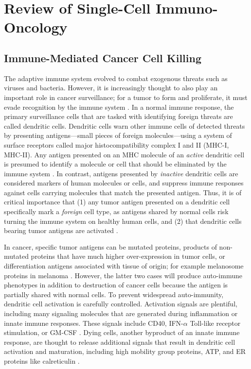 
\chapter[Review of Single-Cell Immuno-Oncology][Review of Single-Cell Immuno-Oncology]{Review of Single-Cell Immuno-Oncology}


\section{Immune-Mediated Cancer Cell Killing}

The adaptive immune system evolved to combat exogenous threats such as viruses and bacteria. 
However, it is increasingly thought to also play an important role in cancer surveillance; for a tumor to form and proliferate, it must evade recognition by the immune system \citep{Corthay2014}. 
In a normal immune response, the primary surveillance cells that are tasked with identifying foreign threats are called dendritic cells. 
Dendritic cells warn other immune cells of detected threats by presenting antigens---small pieces of foreign molecules---using a system of surface receptors called major histocompatibility complex I and II (MHC-I, MHC-II).
Any antigen presented on an MHC molecule of an \textit{active} dendritic cell is presumed to identify a molecule or cell that should be eliminated by the immune system \citep{Joffre2009}.
In contrast, antigens presented by \textit{inactive} dendritic cells are considered markers of human molecules or cells, and suppress immune responses against cells carrying molecules that match the presented antigen.  
Thus, it is of critical importance that (1) any tumor antigen presented on a dendritic cell specifically mark a \textit{foreign} cell type, as antigens shared by normal cells risk turning the immune system on healthy human cells, and (2) that dendritic cells bearing tumor antigens are activated \citep{Darrasse-Jeze2009,Steinman2000}.

In cancer, specific tumor antigens can be mutated proteins, products of non-mutated proteins that have much higher over-expression in tumor cells, or differentiation antigens associated with tissue of origin; for example melanosome proteins in melanoma \citep{Boon2006,Segal2008}.
However, the latter two cases will produce auto-immune phenotypes in addition to destruction of cancer cells because the antigen is partially shared with normal cells.
To prevent widespread auto-immunity, dendritic cell activation is carefully controlled.
Activation signals are plentiful, including many signaling molecules that are generated during inflammation or innate immune responses.
These signals include CD40, IFN-$\alpha$ Toll-like receptor stimulation, or GM-CSF \citep{Lippitz2013}. 
Dying cells, another byproduct of an innate immune response, are thought to release additional signals that result in dendritic cell activation and maturation, including high mobility group proteins, ATP, and ER proteins like calreticulin \citep{Zitvogel2009}.

